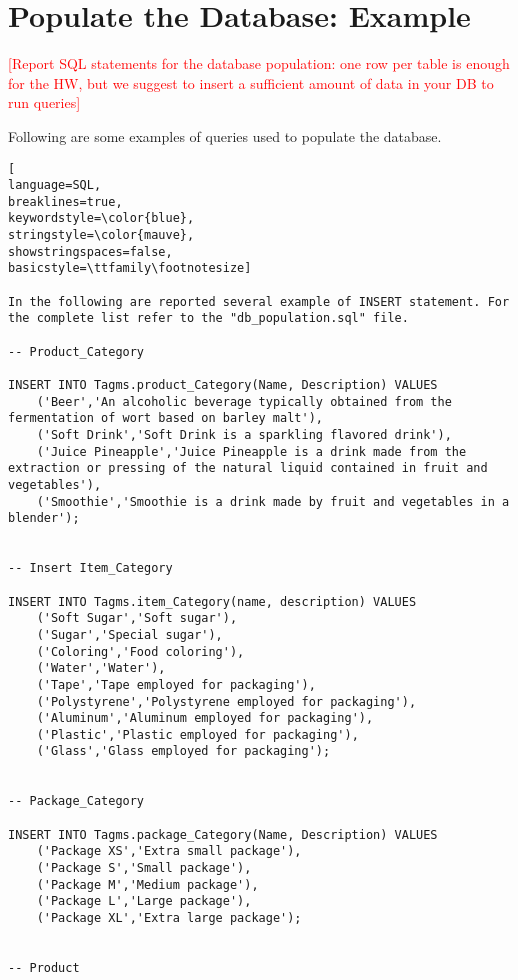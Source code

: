 
\section{Populate the Database: Example}
\textcolor{red}{[Report SQL statements for the database population: one row per table is enough for the HW, but we suggest to insert a sufficient amount of data in your DB to run queries]}

Following are some examples of queries used to populate the database.


\begin{lstlisting}[
language=SQL,
breaklines=true,
keywordstyle=\color{blue},
stringstyle=\color{mauve},
showstringspaces=false,
basicstyle=\ttfamily\footnotesize]

In the following are reported several example of INSERT statement. For the complete list refer to the "db_population.sql" file.

-- Product_Category

INSERT INTO Tagms.product_Category(Name, Description) VALUES
    ('Beer','An alcoholic beverage typically obtained from the fermentation of wort based on barley malt'),
    ('Soft Drink','Soft Drink is a sparkling flavored drink'),
    ('Juice Pineapple','Juice Pineapple is a drink made from the extraction or pressing of the natural liquid contained in fruit and vegetables'),
    ('Smoothie','Smoothie is a drink made by fruit and vegetables in a blender');


-- Insert Item_Category

INSERT INTO Tagms.item_Category(name, description) VALUES
    ('Soft Sugar','Soft sugar'),
    ('Sugar','Special sugar'),
    ('Coloring','Food coloring'),
    ('Water','Water'),
    ('Tape','Tape employed for packaging'),
    ('Polystyrene','Polystyrene employed for packaging'),
    ('Aluminum','Aluminum employed for packaging'),
    ('Plastic','Plastic employed for packaging'),
    ('Glass','Glass employed for packaging');


-- Package_Category

INSERT INTO Tagms.package_Category(Name, Description) VALUES
    ('Package XS','Extra small package'),
    ('Package S','Small package'),
    ('Package M','Medium package'),
    ('Package L','Large package'),
    ('Package XL','Extra large package');


-- Product


\end{lstlisting}
